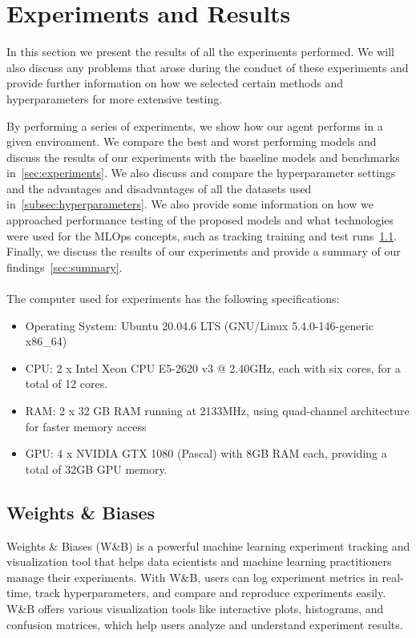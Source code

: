 \documentclass[../xlapes02]{subfiles}
\begin{document}
    \chapter{Experiments and Results}\label{ch:experiments-and-results}
    In this section we present the results of all the experiments performed. We will also discuss any problems that arose during the conduct of these experiments and provide further information on how we selected certain methods and hyperparameters for more extensive testing.

    By performing a series of experiments, we show how our agent performs in a given environment. We compare the best and worst performing models and discuss the results of our experiments with the baseline models and benchmarks in~\cref{sec:experiments}. We also discuss and compare the hyperparameter settings and the advantages and disadvantages of all the datasets used in~\cref{subsec:hyperparameters}. We also provide some information on how we approached performance testing of the proposed models and what technologies were used for the MLOps concepts, such as tracking training and test runs~\cref{sec:wandb}. Finally, we discuss the results of our experiments and provide a summary of our findings~\cref{sec:summary}.
    \\
    \\
    The computer used for experiments has the following specifications:
    \begin{itemize}
        \item Operating System: Ubuntu 20.04.6 LTS (GNU/Linux 5.4.0-146-generic x86\_64)
        \item CPU: 2 x Intel Xeon CPU E5-2620 v3 @ 2.40GHz, each with six cores, for a total of 12 cores.
        \item RAM: 2 x 32 GB RAM running at 2133MHz, using quad-channel architecture for faster memory access
        \item GPU: 4 x NVIDIA GTX 1080 (Pascal) with 8GB RAM each, providing a total of 32GB GPU memory.
    \end{itemize}


    \section{Weights \& Biases}\label{sec:wandb}
    Weights \& Biases (W\&B) is a powerful machine learning experiment tracking and visualization tool that helps data scientists and machine learning practitioners manage their experiments. With W\&B, users can log experiment metrics in real-time, track hyperparameters, and compare and reproduce experiments easily. W\&B offers various visualization tools like interactive plots, histograms, and confusion matrices, which help users analyze and understand experiment results.
\end{document}
